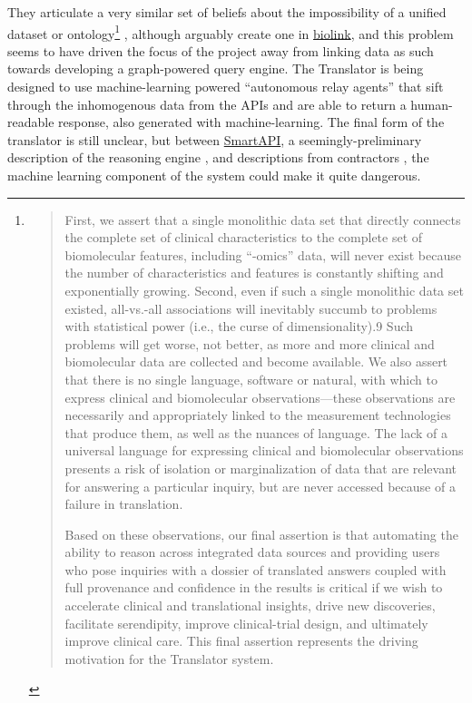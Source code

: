 \documentclass[10pt]{article}
\begin{document}
\begin{multicols}{2}
They articulate a very similar set of beliefs about the impossibility of
a unified dataset or ontology\footnote{\begin{quote}
  First, we assert that a single monolithic data set that directly
  connects the complete set of clinical characteristics to the complete
  set of biomolecular features, including ``-omics'' data, will never
  exist because the number of characteristics and features is constantly
  shifting and exponentially growing. Second, even if such a single
  monolithic data set existed, all-vs.-all associations will inevitably
  succumb to problems with statistical power (i.e., the curse of
  dimensionality).9 Such problems will get worse, not better, as more
  and more clinical and biomolecular data are collected and become
  available. We also assert that there is no single language, software
  or natural, with which to express clinical and biomolecular
  observations---these observations are necessarily and appropriately
  linked to the measurement technologies that produce them, as well as
  the nuances of language. The lack of a universal language for
  expressing clinical and biomolecular observations presents a risk of
  isolation or marginalization of data that are relevant for answering a
  particular inquiry, but are never accessed because of a failure in
  translation.

  Based on these observations, our final assertion is that automating
  the ability to reason across integrated data sources and providing
  users who pose inquiries with a dossier of translated answers coupled
  with full provenance and confidence in the results is critical if we
  wish to accelerate clinical and translational insights, drive new
  discoveries, facilitate serendipity, improve clinical-trial design,
  and ultimately improve clinical care. This final assertion represents
  the driving motivation for the Translator system. \cite{consortiumUniversalBiomedicalData2019} 
  \end{quote}}\cite{consortiumUniversalBiomedicalData2019} ,
although arguably create one in
\href{https://biolink.github.io/biolink-model/docs/}{biolink}, and this
problem seems to have driven the focus of the project away from linking
data as such towards developing a graph-powered query engine. The
Translator is being designed to use machine-learning powered
``autonomous relay agents'' that sift through the inhomogenous data from
the APIs and are able to return a human-readable response, also
generated with machine-learning. The final form of the translator is
still unclear, but between
\href{https://smart-api.info/portal/translator}{SmartAPI}, a
seemingly-preliminary description of the reasoning engine \cite{goelExplanationContainerCaseBased2021} , and descriptions from
contractors \cite{ROBOKOPCoVar2021} , the machine learning
component of the system could make it quite dangerous.


\end{multicols}
\end{document}
